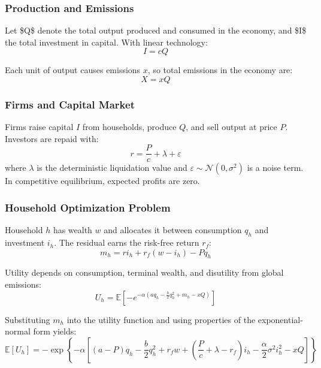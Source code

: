 \documentclass[12pt,a4paper]{article}%
\begin{document}
\subsubsection{Production and Emissions}

Let \$Q\$ denote the total output produced and consumed in the economy, and \$I\$ the total investment in capital. With linear technology:
\begin{equation}
I = cQ 
\end{equation}

Each unit of output causes emissions $x$, so total emissions in the economy are:
\begin{equation}
X = xQ 
\end{equation}

\subsubsection{Firms and Capital Market}

Firms raise capital $I$ from households, produce $Q$, and sell output at price $P$. Investors are repaid with:
\begin{equation}
r = \frac{P}{c} + \lambda + \varepsilon 
\end{equation}
where $\lambda$ is the deterministic liquidation value and $\varepsilon \sim \mathcal{N}(0, \sigma^2)$ is a noise term. In competitive equilibrium, expected profits are zero.

\subsubsection{Household Optimization Problem}

Household $h$ has wealth $w$ and allocates it between consumption $q_h$ and investment $i_h$. The residual earns the risk-free return $r_f$:
\begin{equation}
m_h = r i_h + r_f(w - i_h) - P q_h 
\end{equation}

Utility depends on consumption, terminal wealth, and disutility from global emissions:
\begin{equation}
U_h = \mathbb{E} \left[ -e^{-\alpha \left( a q_h - \frac{b}{2}q_h^2 + m_h - xQ \right)} \right] \tag{5}
\end{equation}

Substituting $m_h$ into the utility function and using properties of the exponential-normal form yields:
\begin{equation}
\mathbb{E}[U_h] = -\exp\left\{ -\alpha \left[ (a - P)q_h - \frac{b}{2}q_h^2 + r_f w + \left( \frac{P}{c} + \lambda - r_f \right)i_h - \frac{\alpha}{2}\sigma^2 i_h^2 - xQ \right] \right\} 
\end{equation}
\end{document}

